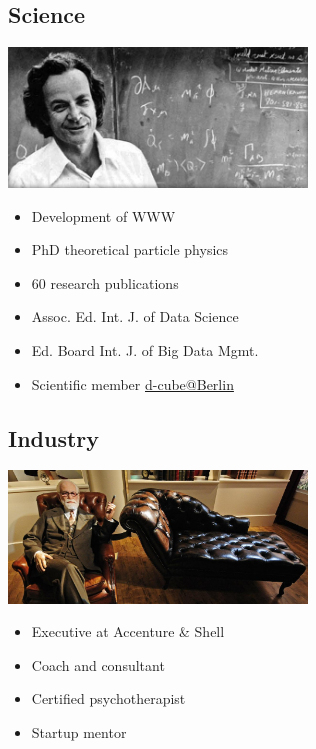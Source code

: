 \documentclass[11pt]{article}
\begin{document}
\subsection*{Science}
\label{sec:orgb911ab2}

\begin{center}
\includegraphics[width=300px]{./img/feynman.jpg}
\end{center}

\begin{itemize}
\item Development of WWW
\item PhD theoretical particle physics
\item 60 research publications
\item Assoc. Ed. Int. J. of Data Science
\item Ed. Board Int. J. of Big Data Mgmt.
\item Scientific member \href{https://www.hwr-berlin.de/en/research/research-centres-and-institutes/}{d-cube@Berlin}
\end{itemize}

\subsection*{Industry}
\label{sec:orgfc8ff37}

\begin{center}
\includegraphics[width=300px]{./img/freud.jpg}
\end{center}

\begin{itemize}
\item Executive at Accenture \& Shell
\item Coach and consultant
\item Certified psychotherapist
\item Startup mentor
\end{itemize}
\end{document}
